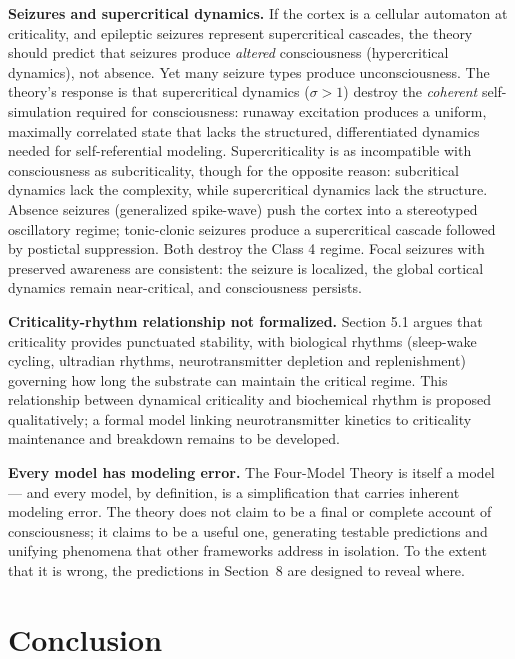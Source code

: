 \documentclass[12pt]{article}
\newcommand{\revstart}{}
\newcommand{\revend}{}
\begin{document}
{\revstart\textbf{Seizures and supercritical dynamics.} If the cortex is a cellular automaton at criticality, and epileptic seizures represent supercritical cascades, the theory should predict that seizures produce \emph{altered} consciousness (hypercritical dynamics), not absence. Yet many seizure types produce unconsciousness. The theory's response is that supercritical dynamics ($\sigma > 1$) destroy the \emph{coherent} self-simulation required for consciousness: runaway excitation produces a uniform, maximally correlated state that lacks the structured, differentiated dynamics needed for self-referential modeling. Supercriticality is as incompatible with consciousness as subcriticality, though for the opposite reason: subcritical dynamics lack the complexity, while supercritical dynamics lack the structure. Absence seizures (generalized spike-wave) push the cortex into a stereotyped oscillatory regime; tonic-clonic seizures produce a supercritical cascade followed by postictal suppression. Both destroy the Class 4 regime. Focal seizures with preserved awareness are consistent: the seizure is localized, the global cortical dynamics remain near-critical, and consciousness persists.\revend}

\textbf{Criticality-rhythm relationship not formalized.} Section 5.1 argues that criticality provides punctuated stability, with biological rhythms (sleep-wake cycling, ultradian rhythms, neurotransmitter depletion and replenishment) governing how long the substrate can maintain the critical regime. This relationship between dynamical criticality and biochemical rhythm is proposed qualitatively; a formal model linking neurotransmitter kinetics to criticality maintenance and breakdown remains to be developed.

\textbf{Every model has modeling error.} The Four-Model Theory is itself a model --- and every model, by definition, is a simplification that carries inherent modeling error. The theory does not claim to be a final or complete account of consciousness; it claims to be a useful one, generating testable predictions and unifying phenomena that other frameworks address in isolation. To the extent that it is wrong, the predictions in Section~8 are designed to reveal where.



\section{Conclusion}
\end{document}
